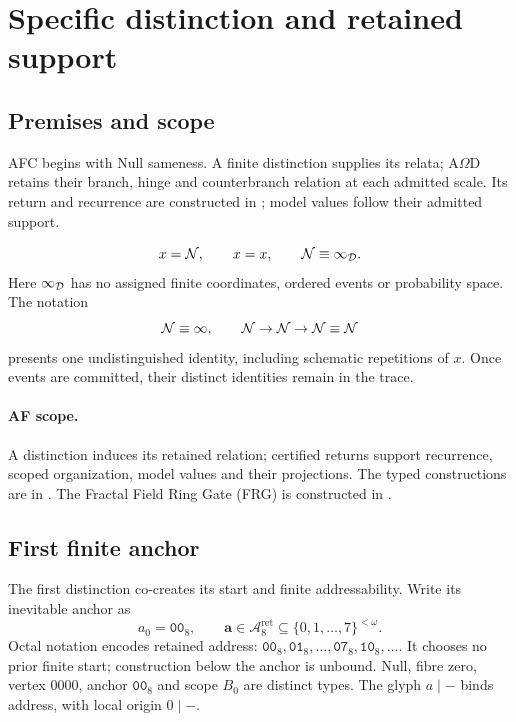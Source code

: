 \section{Specific distinction and retained support}
\label{sec:specific-distinction}
\label{sec:introduction}
\label{sec:afc-basis}

\subsection{Premises and scope}
\label{subsec:intro-aim-stance}
\label{subsec:intro-scope}
\label{subsec:afc-null-potential}
AFC begins with Null sameness. A finite distinction supplies its relata;
A\(\Omega\)D retains their branch, hinge and counterbranch relation at each
admitted scale. Its return and recurrence are constructed in
; model values follow their admitted support.

\label{subsec:null-presentation}
\begin{equation}
x=\mathcal{N},\qquad x=x,\qquad \mathcal{N}\equiv\infty_{\mathcal{D}}.
\label{eq:null-axiom}
\end{equation}
Here \(\infty_{\mathcal{D}}\) has no assigned finite coordinates, ordered events or probability
space. The notation
\begin{equation}
\mathcal{N}\equiv\infty,\qquad \mathcal{N}\to\mathcal{N}\to\mathcal{N}\equiv\mathcal{N}
\label{eq:null-presentation}
\end{equation}
presents one undistinguished identity, including schematic repetitions of
\(x\). Once events are committed, their distinct identities remain in the trace.

\paragraph{AF scope.}
\label{subsec:intro-use}
A distinction induces its retained relation; certified returns support
recurrence, scoped organization, model values and their projections.
The typed constructions are in .
The Fractal Field Ring Gate (FRG) is constructed in .

\subsection{First finite anchor}
\label{subsec:afc-fractal-address}
The first distinction co-creates its start and finite addressability. Write
its inevitable anchor as
\begin{equation}
a_0=\mathtt{00}_8,\qquad
\mathbf a\in\mathcal A^{\mathrm{ret}}_8
\subseteq\{0,1,\ldots,7\}^{<\omega}.
\label{eq:first-anchor}
\end{equation}
Octal notation encodes retained address:
\(\mathtt{00}_8,\mathtt{01}_8,\ldots,\mathtt{07}_8,\mathtt{10}_8,\ldots\).
It chooses no prior finite start; construction below the anchor is unbound.
Null, fibre zero, vertex \(0000\), anchor \(\mathtt{00}_8\) and scope \(B_0\)
are distinct types. The glyph \(a\mid-\) binds address, with local origin
\(0\mid-\).

